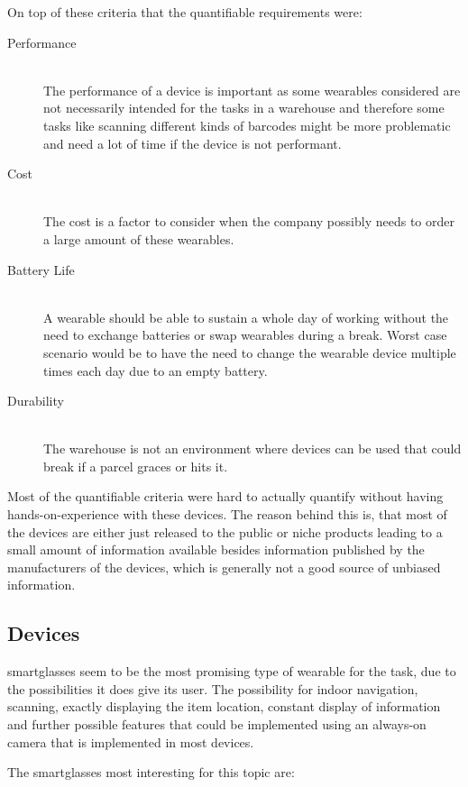 On top of these criteria that the quantifiable requirements were:

\begin{description}
	\item[Performance] \hfill \\
	The performance of a device is important as some wearables considered are not necessarily intended for the tasks in a warehouse and therefore some tasks like scanning different kinds of barcodes might be more problematic and need a lot of time if the device is not performant.
	\item[Cost] \hfill \\
	The cost is a factor to consider when the company possibly needs to order a large amount of these wearables.
	\item[Battery Life] \hfill \\
	A wearable should be able to sustain a whole day of working without the need to exchange batteries or swap wearables during a break. Worst case scenario would be to have the need to change the wearable device multiple times each day due to an empty battery.
	\item[Durability] \hfill \\
	The warehouse is not an environment where devices can be used that could break if a \gls{parcel} graces or hits it.
\end{description}
Most of the quantifiable criteria were hard to actually quantify without having hands-on-experience with these devices. The reason behind this is, that most of the devices are either just released to the public or niche products leading to a small amount of information available besides information published by the manufacturers of the devices, which is generally not a good source of unbiased information.

\subsection{Devices}

\Gls{smartglasses} seem to be the most promising type of wearable for the task, due to the possibilities it does give its user. The possibility for indoor navigation, scanning, exactly displaying the item location, constant display of information and further possible features that could be implemented using an always-on camera that is implemented in most devices. \citep{phdthesis:pickByVision}

The \gls{smartglasses} most interesting for this topic are:

